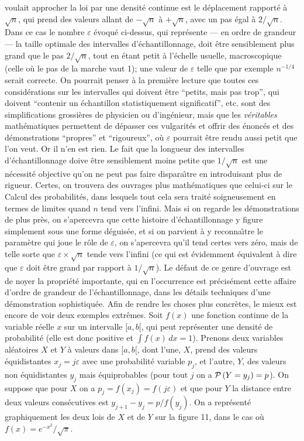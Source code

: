 voulait approcher la loi par une densit\'e continue est le d\'eplacement
rapport\'e \`a $\sqrt{n}$, qui prend des valeurs allant de $-\sqrt{n}$ \`a
$+\sqrt{n}$, avec un pas \'egal \`a $2/\sqrt{n}$. Dans ce cas le nombre
$\varepsilon$ \'evoqu\'e ci-dessus, qui repr\'esente --- en ordre de 
grandeur --- la taille optimale des intervalles d'\'echantillonnage, doit
\^etre sensiblement plus grand que le pas $2/\sqrt{n}$, tout en \'etant
petit \`a l'\'echelle usuelle, macroscopique (celle o\`u le pas de la 
marche vaut 1); une valeur de $\varepsilon$ telle que par exemple
$n^{-1/4}$ serait correcte.   
\medskip
On pourrait penser \`a la premi\`ere lecture que toutes ces 
consid\'erations sur les intervalles qui doivent \^etre ``petits, mais pas
trop'', qui doivent ``contenir un \'echantillon statistiquement significatif'',
etc. sont des simplifications grossi\`eres de physicien ou d'ing\'enieur,
mais que les  {\it v\'eritables} math\'ematiques permettent de d\'epasser
ces vulgarit\'es et offrir des \'enonc\'es et des d\'emonstrations
``propres'' et ``rigoureux'', o\`u  $\varepsilon$ pourrait \^etre rendu aussi
petit que l'on veut. 
\medskip
Or il n'en est rien.  Le fait que la longueur des intervalles 
d'\'echan\-til\-lon\-nage doive \^etre sensiblement moins petite que
$1/\sqrt{n}$ est une n\'ecessit\'e objective qu'on ne peut pas faire
dispara{\^\i}tre en introduisant plus de rigueur.  Certes,  on trouvera
des
ouvrages plus {\og math\'ematiques\fg} que celui-ci sur le Calcul des
probabilit\'es,  dans lesquels tout cela sera trait\'e soigneusement en
termes de limites quand $n$ tend vers l'infini.  Mais si on regarde les
d\'emonstrations de plus pr\`es,  on s'apercevra que cette histoire
d'\'echantillonnage y figure simplement sous une forme d\'eguis\'ee,  et si
on parvient \`a y reconna{\^\i}tre le param\`etre qui joue le r\^ole de
$\varepsilon$,  on s'apercevra qu'il tend certes vers z\'ero,  mais de telle
sorte que $\varepsilon \times \sqrt{n}$ tende vers l'infini (ce qui est
\'evidemment \'equivalent \`a dire que $\varepsilon$ doit \^etre grand par
rapport \`a $1 / \sqrt{n}$).  Le d\'efaut de ce genre d'ouvrage est
de noyer la propri\'et\'e importante,  qui en l'occurrence est
pr\'ecis\'ement cette affaire d'ordre de grandeur de l'\'echantillonnage,
dans les d\'etails techniques d'une d\'emonstration sophistiqu\'ee.
\medskip 
Afin de rendre les choses plus concr\`etes,  le mieux est encore
de voir deux exemples extr\^emes.
\medskip
Soit $f(x)$ une fonction continue de la variable r\'eelle $x$ sur un 
intervalle $[a,b[$,  qui peut repr\'esenter une densit\'e de probabilit\'e 
(elle est donc positive et $\int f(x)\, dx = 1$). 
Prenons deux variables al\'eatoires $X$ et $Y$ \`a valeurs dans $[a,b[$, 
dont l'une,  $X$,  prend des valeurs \'equidistantes $x_j = j\varepsilon$
avec une probabilit\'e variable $p_j$,  et l'autre,  $Y$,  des valeurs non
\'equidistantes $y_j$ mais \'equiprobables (pour tout $j$ on a ${\cal P}\, 
(Y = y_j)  = p$).  On suppose que pour $X$ on a $p_j = f(x_j) =
f(j\varepsilon)$ et que pour $Y$ la distance entre deux valeurs
cons\'ecutives est $y_{j+1} - y_{j} = p / f(y_j)$.  On a repr\'esent\'e
graphiquement les deux lois de $X$ et de $Y$ sur la figure 11,  dans le cas
o\`u $f(x) = e^{-x^2}/\sqrt{\pi}$.

